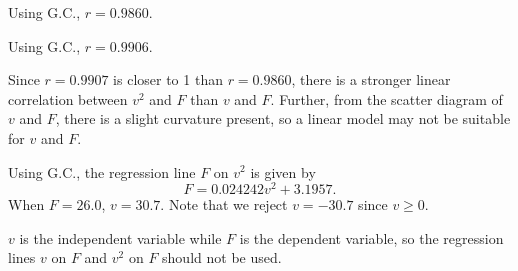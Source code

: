 \begin{solution}
    \begin{ppart}
        \begin{figure}[H]
            \centering
        \end{figure}
    \end{ppart}
    \begin{ppart}
        \begin{psubpart}
            Using G.C., $r = 0.9860$.
        \end{psubpart}
        \begin{psubpart}
            Using G.C., $r = 0.9906$.
        \end{psubpart}
    \end{ppart}
    \begin{ppart}
        Since $r = 0.9907$ is closer to 1 than $r = 0.9860$, there is a stronger linear correlation between $v^2$ and $F$ than $v$ and $F$. Further, from the scatter diagram of $v$ and $F$, there is a slight curvature present, so a linear model may not be suitable for $v$ and $F$.
    \end{ppart}
    \begin{ppart}
        Using G.C., the regression line $F$ on $v^2$ is given by \[F = 0.024242v^2 + 3.1957.\] When $F = 26.0$, $v = 30.7$. Note that we reject $v = -30.7$ since $v \geq 0$.

        $v$ is the independent variable while $F$ is the dependent variable, so the regression lines $v$ on $F$ and $v^2$ on $F$ should not be used.
    \end{ppart}
\end{solution}

